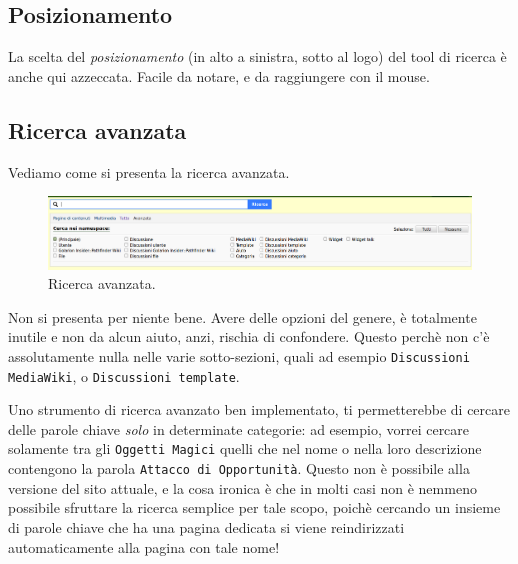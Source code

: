 \subsection{Posizionamento}

La scelta del \emph{posizionamento} (in alto a sinistra, sotto al logo) del tool di ricerca è anche qui azzeccata. 
Facile da notare, e da raggiungere con il mouse.

\subsection{Ricerca avanzata}

Vediamo come si presenta la ricerca avanzata.

\begin{figure}[hbt]
    \includegraphics[width=\textwidth]{img/ricerca3.png}
    \caption{Ricerca avanzata.}
\end{figure}

Non si presenta per niente bene. Avere delle opzioni del genere, è totalmente inutile e non da alcun aiuto, anzi, 
rischia di confondere. Questo perchè non c'è assolutamente nulla nelle varie sotto-sezioni, quali ad esempio
\texttt{Discussioni MediaWiki}, o \texttt{Discussioni template}.\par
Uno strumento di ricerca avanzato ben implementato, ti permetterebbe di cercare delle parole chiave \emph{solo}
in determinate categorie: ad esempio, vorrei cercare solamente tra gli \texttt{Oggetti Magici} quelli che nel nome
o nella loro descrizione contengono la parola \texttt{Attacco di Opportunità}. Questo non è possibile alla versione
del sito attuale, e la cosa ironica è che in molti casi non è nemmeno possibile sfruttare la ricerca semplice per tale
scopo, poichè cercando un insieme di parole chiave che ha una pagina dedicata si viene reindirizzati automaticamente alla pagina
con tale nome!